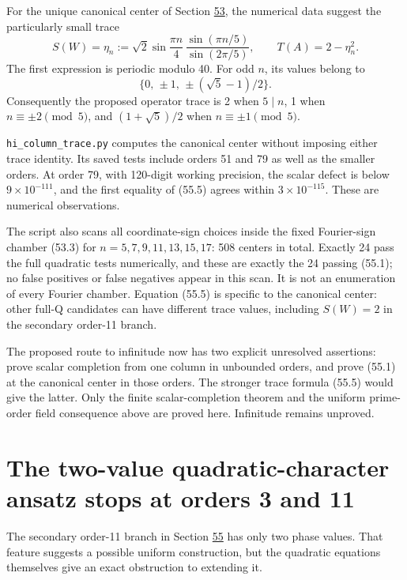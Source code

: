\documentclass[11pt,reqno]{amsart}
\theoremstyle{plain}
\begin{document}
For the unique canonical center of Section \hyperref[sec:53]{53}, the numerical data
suggest the particularly small trace
\begin{equation*}
 \boxed{\displaystyle
 S(W)=\eta_n:=
 \sqrt2\sin\frac{\pi n}{4}\,
 \frac{\sin(\pi n/5)}{\sin(2\pi/5)},\qquad
 T(A)=2-\eta_n^2.}\tag{55.5}
\end{equation*}
The first expression is periodic modulo 40. For odd \(n\), its
values belong to
\[
 \{0,\,\pm1,\,\pm(\sqrt5-1)/2\}.
\]
Consequently the proposed operator trace is 2 when \(5\mid n\),
1 when \(n\equiv\pm2\pmod5\), and \((1+\sqrt5)/2\) when
\(n\equiv\pm1\pmod5\).

\texttt{hi\_\allowbreak column\_\allowbreak trace.py} computes the canonical center without imposing
either trace identity. Its saved tests include orders 51 and 79 as
well as the smaller orders. At order 79, with 120-digit working
precision, the scalar defect is below \(9\times10^{-111}\), and
the first equality of (55.5) agrees within
\(3\times10^{-115}\). These are numerical observations.

The script also scans all coordinate-sign choices inside the fixed
Fourier-sign chamber (53.3) for \(n=5,7,9,11,13,15,17\):
508 centers in total. Exactly 24 pass the full quadratic tests
numerically, and these are exactly the 24 passing (55.1); no
false positives or false negatives appear in this scan. It is not
an enumeration of every Fourier chamber. Equation (55.5) is specific
to the canonical center: other full-Q candidates can have different
trace values, including \(S(W)=2\) in the secondary order-11 branch.

The proposed route to infinitude now has two explicit unresolved
assertions: prove scalar completion from one column in unbounded
orders, and prove (55.1) at the canonical center in those orders.
The stronger trace formula (55.5) would give the latter. Only the
finite scalar-completion theorem and the uniform prime-order field
consequence above are proved here. Infinitude remains unproved.

\section{The two-value quadratic-character ansatz stops at orders 3 and 11}\label{sec:56}

The secondary order-11 branch in Section \hyperref[sec:55]{55} has only two phase values.
That feature suggests a possible uniform construction, but the quadratic
equations themselves give an exact obstruction to extending it.
\end{document}
